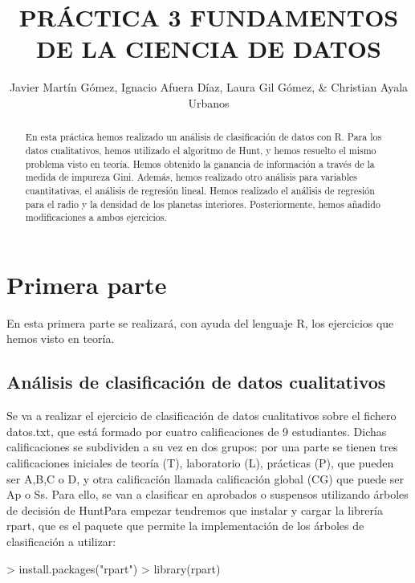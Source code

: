 \documentclass [a4paper] {article}
\title{PRÁCTICA 3 FUNDAMENTOS DE LA CIENCIA DE DATOS}
\author{Javier Martín Gómez, Ignacio Afuera Díaz, Laura Gil Gómez, & Christian Ayala Urbanos}
\begin{document}
\maketitle

\begin{abstract}
En esta práctica hemos realizado un análisis de clasificación de datos con R. Para los datos cualitativos,
hemos utilizado el algoritmo de Hunt, y hemos resuelto el mismo problema visto en teoría. Hemos obtenido
la ganancia de información a través de la medida de impureza Gini. Además, hemos realizado otro análisis 
para variables cuantitativas, el análisis de regresión lineal. Hemos realizado el análisis de regresión 
para el radio y la densidad de los planetas interiores. Posteriormente, hemos añadido modificaciones a ambos
ejercicios.

\end{abstract}

\newpage
\tableofcontents
\newpage


\section{Primera parte}

En esta primera parte se realizará, con ayuda del lenguaje R, los ejercicios que hemos visto en teoría.

\subsection{Análisis de clasificación de datos cualitativos}

Se va a realizar el ejercicio de clasificación de datos cualitativos sobre el fichero datos.txt, que está formado
por cuatro calificaciones de 9 estudiantes. Dichas calificaciones se subdividen a su vez en dos grupos: por una
parte se tienen tres calificaciones iniciales de teoría (T), laboratorio (L), prácticas (P), que pueden ser A,B,C
o D, y otra calificación llamada calificación global (CG) que puede ser Ap o Ss. Para ello, se van a clasificar en 
aprobados o suspensos utilizando árboles de decisión de HuntPara empezar tendremos que
instalar y cargar la librería rpart, que es el paquete que permite la implementación de los árboles de
clasificación a utilizar:

\begin{Schunk}
\begin{Sinput}
> install.packages("rpart")
> library(rpart)
\end{Sinput}
\end{Schunk}
\end{document}

